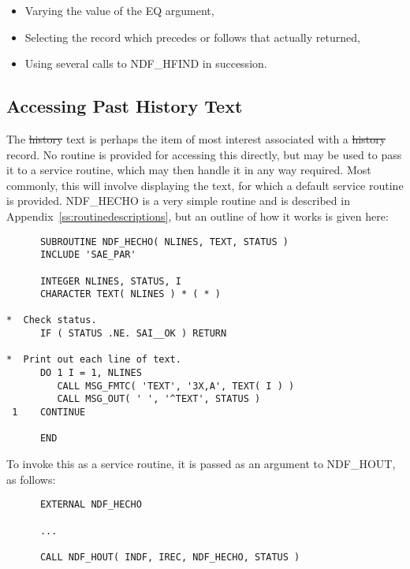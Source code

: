 \begin{itemize}

\item Varying the value of the EQ argument,

\item Selecting the record which precedes or follows that actually returned,

\item Using several calls to NDF\_HFIND in succession.

\end{itemize}

\subsection{Accessing Past History Text}

The \st{history\/} text is perhaps the item of most interest associated
with a \st{history\/} record. No routine is provided for accessing this
directly, but  may be used to pass it to a service routine,
which may then handle it in any way required. Most commonly, this will
involve displaying the text, for which a default service routine
 is provided. NDF\_HECHO is a very simple routine and is
described in Appendix~\ref{ss:routinedescriptions}, but an outline of
how it works is given here:

\small
\begin{verbatim}
      SUBROUTINE NDF_HECHO( NLINES, TEXT, STATUS )
      INCLUDE 'SAE_PAR'

      INTEGER NLINES, STATUS, I
      CHARACTER TEXT( NLINES ) * ( * )

*  Check status.
      IF ( STATUS .NE. SAI__OK ) RETURN

*  Print out each line of text.
      DO 1 I = 1, NLINES
         CALL MSG_FMTC( 'TEXT', '3X,A', TEXT( I ) )
         CALL MSG_OUT( ' ', '^TEXT', STATUS )
 1    CONTINUE

      END
\end{verbatim}
\normalsize

To invoke this as a service routine, it is passed as an argument to
NDF\_HOUT, as follows:

\small
\begin{verbatim}
      EXTERNAL NDF_HECHO

      ...

      CALL NDF_HOUT( INDF, IREC, NDF_HECHO, STATUS )
\end{verbatim}
\normalsize

